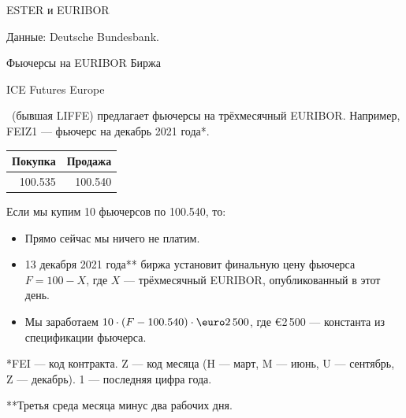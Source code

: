 \documentclass{beamer}
\renewcommand{\EUR}[1]{\textup{\euro}#1}
\newcommand{\en}[1]{\begin{otherlanguage}{english}#1\end{otherlanguage}}
\begin{document}
\begin{frame}{ESTER и EURIBOR}
\centering
{}

\scriptsize Данные: Deutsche Bundesbank.
\end{frame}



\begin{frame}{Фьючерсы на EURIBOR}
\justify
Биржа \en{ICE Futures Europe}\ (бывшая LIFFE) предлагает фьючерсы на трёхмесячный EURIBOR. Например, \alert{FEIZ1} --- фьючерс на декабрь 2021 года*.

\justify
\centering
\begin{tabular}{r|r}
Покупка & Продажа \\ \hline
100.535 & 100.540
\end{tabular}

\justify
Если мы купим 10 фьючерсов по 100.540, то:
\begin{itemize}
\justifying
\item Прямо сейчас мы ничего не платим.
\item 13 декабря 2021 года** биржа установит финальную цену фьючерса $F = 100 - X$, где $X$ --- трёхмесячный EURIBOR, опубликованный в этот день.
\item Мы заработаем $10 \cdot (F - 100.540) \cdot \EUR{2\,500}$, где \EUR{2\,500} --- константа из спецификации фьючерса.
\end{itemize}

\justify
*FEI --- код контракта. Z --- код месяца (H --- март, M --- июнь, U --- сентябрь, Z --- декабрь). 1 --- последняя цифра года.

\justify
**Третья среда месяца минус два рабочих дня.
\end{frame}
\end{document}
